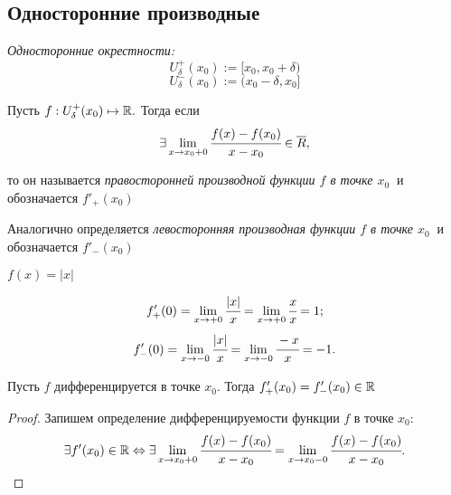 \subsection{Односторонние производные}
\begin{definition}
    \textit{Односторонние окрестности:}
    $$
    U^{+}_{\delta} (x_{0}) := [x_{0}, x_{0} + \delta) 
    $$
    $$
    U^{-}_{\delta} (x_{0}) := (x_{0} - \delta, x_{0}]
    $$
\end{definition}

\begin{definition}
    Пусть $f:U^{+}_{\delta} (x_{0}) \mapsto \mathbb{R}.$ Тогда если
    $$\exists \lim\limits_{x \to x_{0} +0} \cfrac{f(x) - f(x_{0})}{x-x_{0}} \in \overline{R},$$

    то он называется \textit{правосторонней производной функции $f$ в точке $x_{0} \ $} и обозначается $f'_{+}(x_{0})$

    Аналогично определяется \textit{левосторонняя производная функции $f$ в точке $x_{0} \ $} и обозначается $f'_{-}(x_{0})$
\end{definition}
\begin{example}
    $ f(x) = |x| $

    $$
    f'_{+}(0) = \lim\limits_{x \to +0} \cfrac{|x|}{x} = \lim\limits_{x\to +0} \cfrac{x}{x} = 1;
    $$
    $$
    f'_{-}(0) = \lim\limits_{x \to -0} \cfrac{|x|}{x} = \lim\limits_{x\to -0} \cfrac{-x}{x} = -1.
    $$
\end{example}

\begin{theorem}
    Пусть $f$ дифференцируется в точке $x_{0}$. Тогда $f'_{+}(x_{0}) = f'_{-}(x_{0}) \in \mathbb{R}$ 
\end{theorem}
\begin{proof}
    Запишем определение дифференцируемости функции $f$ в точке $x_{0}$:
    $$
    \exists f'(x_{0}) \in \mathbb{R} \Leftrightarrow \exists \lim\limits_{x \to x_{0} +0}  \cfrac{f(x) - f(x_{0})}{x-x_{0}} = \lim\limits_{x \to x_{0} -0} \cfrac{f(x) - f(x_{0})}{x-x_{0}}.$$
\end{proof}

